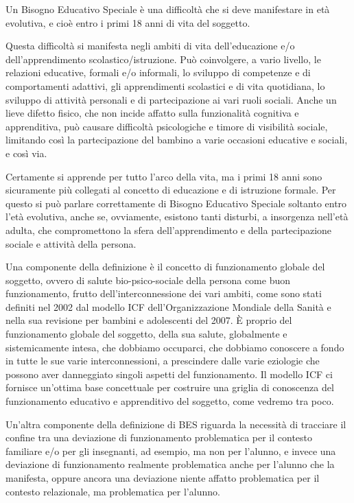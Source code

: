Un Bisogno Educativo Speciale è una difficoltà che si deve manifestare in età evolutiva, e cioè
entro i primi 18 anni di vita del soggetto.

Questa difficoltà si manifesta negli ambiti di vita dell'educazione e/o dell'apprendimento
scolastico/istruzione. Può coinvolgere, a vario livello, le relazioni educative, formali e/o informali,
lo sviluppo di competenze e di comportamenti adattivi, gli apprendimenti scolastici e di vita
quotidiana, lo sviluppo di attività personali e di partecipazione ai vari ruoli sociali. Anche un lieve
difetto fisico, che non incide affatto sulla funzionalità cognitiva e apprenditiva, può causare
difficoltà psicologiche e timore di visibilità sociale, limitando così la partecipazione del bambino a
varie occasioni educative e sociali, e così via.

Certamente si apprende per tutto l'arco della vita, ma i primi 18 anni sono sicuramente più
collegati al concetto di educazione e di istruzione formale. Per questo si può parlare correttamente
di Bisogno Educativo Speciale soltanto entro l'età evolutiva, anche se, ovviamente, esistono tanti
disturbi, a insorgenza nell'età adulta, che compromettono la sfera dell'apprendimento e della
partecipazione sociale e attività della persona.

Una componente della definizione è il concetto di funzionamento globale del soggetto, ovvero
di salute bio-psico-sociale della persona come buon funzionamento, frutto dell'interconnessione
dei vari ambiti, come sono stati definiti nel 2002 dal modello ICF dell'Organizzazione Mondiale
della Sanità e nella sua revisione per bambini e adolescenti del 2007. È proprio del funzionamento
globale del soggetto, della sua salute, globalmente e sistemicamente intesa, che dobbiamo
occuparci, che dobbiamo conoscere a fondo in tutte le sue varie interconnessioni, a prescindere
dalle varie eziologie che possono aver danneggiato singoli aspetti del funzionamento. Il modello
ICF ci fornisce un'ottima base concettuale per costruire una griglia di conoscenza del
funzionamento educativo e apprenditivo del soggetto, come vedremo tra poco.

Un'altra componente della definizione di BES riguarda la necessità di tracciare il confine tra
una deviazione di funzionamento problematica per il contesto familiare e/o per gli insegnanti, ad
esempio, ma non per l'alunno, e invece una deviazione di funzionamento realmente problematica
anche per l'alunno che la manifesta, oppure ancora una deviazione niente affatto problematica per
il contesto relazionale, ma problematica per l'alunno.

